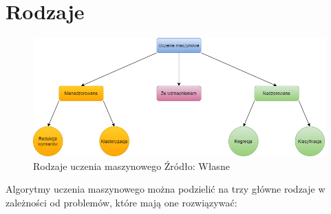 \section{Rodzaje}
\begin{figure}[h]
    \centering
    \includegraphics[width=1\textwidth]{./Img/typesofLearning.png}
    \caption{Rodzaje uczenia maszynowego Źródło: Własne}
\end{figure}
Algorytmy uczenia maszynowego można podzielić na trzy główne rodzaje w zależności od problemów, które mają one rozwiązywać:
